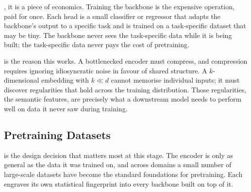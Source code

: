 , it is a piece of economics. Training the backbone is the expensive operation, paid for once. Each head is a small classifier or regressor that adapts the backbone's output to a specific task and is trained on a task-specific dataset that may be tiny. The backbone never sees the task-specific data while it is being built; the task-specific data never pays the cost of pretraining.

 is the reason this works. A bottlenecked encoder must compress, and compression requires ignoring idiosyncratic noise in favour of shared structure. A $k$-dimensional embedding with $k \ll d$ cannot memorise individual inputs; it must discover regularities that hold across the training distribution. Those regularities, the semantic features, are precisely what a downstream model needs to perform well on data it never saw during training.

\subsection{Pretraining Datasets}

 is the design decision that matters most at this stage. The encoder is only as general as the data it was trained on, and across domains a small number of large-scale datasets have become the standard foundations for pretraining. Each engraves its own statistical fingerprint into every backbone built on top of it.

